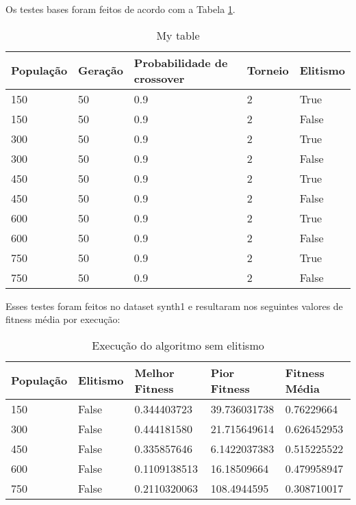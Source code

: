 \documentclass[]{article}
\begin{document}
Os testes bases foram feitos de acordo com a Tabela \ref{tabela1}.

\begin{table}[H]
	\begin{tabular}{lllll}
		População & Geração & Probabilidade de crossover & Torneio & Elitismo \\
		\hline
		150       & 50      & 0.9                        & 2       & True     \\
		150       & 50      & 0.9                        & 2       & False    \\
		300       & 50      & 0.9                        & 2       & True     \\
		300       & 50      & 0.9                        & 2       & False    \\
		450       & 50      & 0.9                        & 2       & True     \\
		450       & 50      & 0.9                        & 2       & False    \\
		600       & 50      & 0.9                        & 2       & True     \\
		600       & 50      & 0.9                        & 2       & False    \\
		750       & 50      & 0.9                        & 2       & True     \\
		750       & 50      & 0.9                        & 2       & False   
	\end{tabular}
	\caption{My table}
	\label{tabela1}
\end{table}

Esses testes foram feitos no dataset synth1 e resultaram nos seguintes valores de fitness média por execução:

\begin{table}[H]
	\begin{tabular}{|ll|lll}
		População & Elitismo & Melhor Fitness      & Pior Fitness       & Fitness Média      \\
		\hline
		150       & False    & 0.344403723  & 39.736031738  & 0.76229664 \\
		300       & False    & 0.444181580 & 21.715649614  & 0.626452953 \\
		450       & False    & 0.335857646 & 6.1422037383  & 0.515225522 \\
		600       & False    & 0.1109138513 & 16.18509664  & 0.479958947 \\
		750       & False    & 0.2110320063  & 108.4944595 & 0.308710017
	\end{tabular}
	\caption{Execução do algoritmo sem elitismo}
\end{table}
\end{document}
